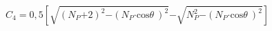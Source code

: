 \begin{equation}
C_{\mathrm{4}}\mathrm{=0,5}\left[\sqrt{{\left(N_P\mathrm{+2}\right)}^{\mathrm{2}}\mathrm{-}{\left(N_P\mathrm{\cdot }{\mathrm{cos} \theta \ }\right)}^{\mathrm{2}}}\mathrm{-}\sqrt{N^{\mathrm{2}}_P\mathrm{-}{\left(N_P\mathrm{\cdot }{\mathrm{cos} \theta \ }\right)}^{\mathrm{2}}}\right]
\end{equation}